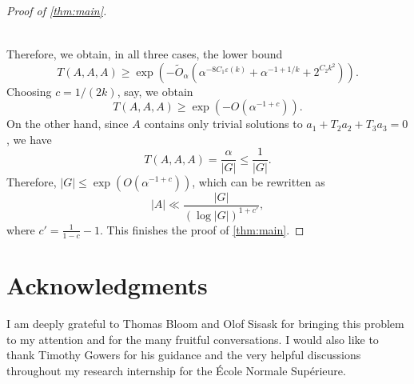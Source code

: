 \documentclass{daj}
\theoremstyle{definition}
\newcommand{\eps}{\varepsilon}
\begin{document}
\begin{proof}[Proof of \cref{thm:main}]
\begin{itemize}
\begin{align*}
	\end{align*}
\end{itemize}
Therefore, we obtain, in all three cases, the lower bound
\begin{equation*}
T(A, A, A) \geq\exp \left(-\tilde{O}_{\alpha}\left(\alpha^{-8C_1\eps(k)}+\alpha^{-1+1/k}+ 2^{C_2k^2}\right)\right).
\end{equation*}
Choosing $c = 1/(2k)$, say, we obtain 
\begin{equation*}
T(A, A, A) \geq \exp \left(-{O}(\alpha^{-1+c})\right).
\end{equation*}
On the other hand, since $A$ contains only trivial solutions to $a_1 + T_2a_2 + T_3a_3 = 0$, we have 
\begin{equation*}
T(A, A, A) = \frac{\alpha}{|G|} \leq \frac{1}{|G|}.
\end{equation*}
Therefore, $|G| \leq \exp\left({O}(\alpha^{-1+c})\right)$, which can be rewritten as
\begin{equation*}
|A| \ll \frac{|G|}{(\log{|G|})^{1+c'}},
\end{equation*}
where $c' = \frac{1}{1-c}-1$. This finishes the proof of \cref{thm:main}.
\end{proof}


\section*{Acknowledgments} %
I am deeply grateful to Thomas Bloom and Olof Sisask for bringing this problem to my attention and for the many fruitful conversations. I would also like to thank Timothy Gowers for his guidance and the very helpful discussions throughout my research internship for the \'Ecole Normale Supérieure.
\end{document}
